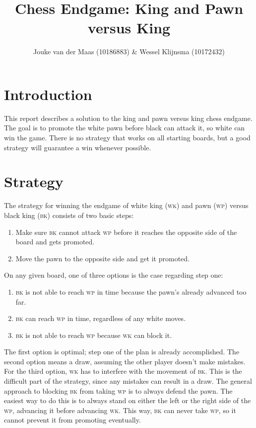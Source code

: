 \documentclass[titlepage,a4paper, 11pt]{article}
\newcommand{\bk}{\textsc{bk}\xspace}
\newcommand{\wk}{\textsc{wk}\xspace}
\renewcommand{\wp}{\textsc{wp}\xspace}
\begin{document}
\title{Chess Endgame: King and Pawn versus King}
\author{Jouke van der Maas {\footnotesize (10186883)} \& Wessel Klijnsma {\footnotesize (10172432)}}
\maketitle

\section*{Introduction}
This report describes a solution to the king and pawn versus king chess endgame. The goal is to
promote the white pawn before black can attack it, so white can win the game. There is no strategy
that works on all starting boards, but a good strategy will guarantee a win whenever possible.

\section{Strategy}
\label{sec:strategy}
The strategy for winning the endgame of white king (\wk) and pawn (\wp) versus black king (\bk) consists
of two basic steps:
\begin{enumerate}
    \item Make sure \bk cannot attack \wp before it reaches the opposite 
    	side of the board and gets promoted.
    \item Move the pawn to the opposite side and get it promoted.
\end{enumerate}

On any given board, one of three options is the case regarding step one:
\begin{enumerate}
    \item \bk is not able to reach \wp in time because the pawn's already advanced too far.
    \item \bk can reach \wp in time, regardless of any white moves. 
    \item \bk is not able to reach \wp because \wk can block it.
\end{enumerate}

The first option is optimal; step one of the plan is already accomplished. The second option means a
draw, assuming the other player doesn't make mistakes. For the third option, \wk has 
to interfere with the movement of \bk. This is the difficult part of the strategy, since any mistakes can
result in a draw. The general approach to blocking \bk from taking \wp is to always defend the pawn. The
easiest way to do this is to always stand on either the left or the right side of the \wp, advancing it
before advancing \wk. This way, \bk can never take \wp, so it cannot prevent it from promoting eventually.
\end{document}
